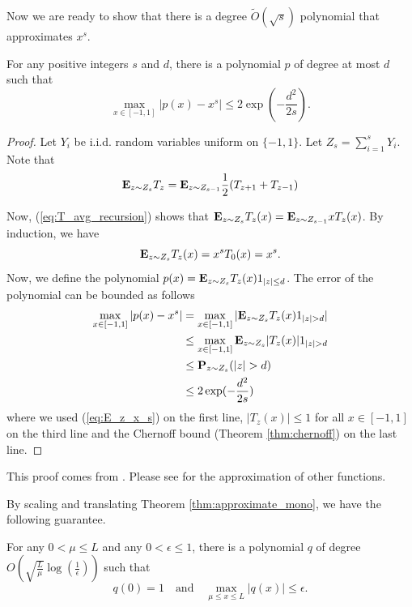 Now we are ready to show that there is a degree $\tilde{O}(\sqrt{s})$
polynomial that approximates $x^{s}$.
\begin{thm}
\label{thm:approximate_mono}For any positive integers $s$ and $d$,
there is a polynomial $p$ of degree at most $d$ such that
\[
\max_{x\in[-1,1]}|p(x)-x^{s}|\leq2\exp(-\frac{d^{2}}{2s}).
\]
\end{thm}

\begin{proof}
Let $Y_{i}$ be i.i.d. random variables uniform on $\{-1,1\}$. Let
$Z_{s}=\sum^{s}_{i=1}Y_{i}$. Note that
\[
\mathbf{E}_{z\sim Z_{s}}T_{z}=\mathbf{E}_{z\sim Z_{s-1}}\frac{1}{2}(T_{z+1}+T_{z-1})
\]

Now, (\ref{eq:T_avg_recursion}) shows that $\mathbf{E}_{z\sim Z_{s}}T_{z}(x)=\mathbf{E}_{z\sim Z_{s-1}}xT_{z}(x)$.
By induction, we have
\begin{equation}
\mathbf{E}_{z\sim Z_{s}}T_{z}(x)=x^{s}T_{0}(x)=x^{s}.\label{eq:E_z_x_s}
\end{equation}
Now, we define the polynomial $p(x)=\mathbf{E}_{z\sim Z_{s}}T_{z}(x)1_{|z|\leq d}$.
The error of the polynomial can be bounded as follows
\begin{align*}
\max_{x\in[-1,1]}|p(x)-x^{s}| & =\max_{x\in[-1,1]}|\E_{z\sim Z_{s}}T_{z}(x)1_{|z|>d}|\\
 & \leq\max_{x\in[-1,1]}\E_{z\sim Z_{s}}|T_{z}(x)|1_{|z|>d}\\
 & \leq\P_{z\sim Z_{s}}(|z|>d)\\
 & \leq2\exp(-\frac{d^{2}}{2s})
\end{align*}
where we used (\ref{eq:E_z_x_s}) on the first line, $|T_{z}(x)|\leq1$
for all $x\in[-1,1]$ on the third line and the Chernoff bound (Theorem
\ref{thm:chernoff}) on the last line.
\end{proof}
\begin{rem*}
This proof comes from \cite{sachdeva2014faster}. Please see \cite{sachdeva2014faster}
for the approximation of other functions.
\end{rem*}
By scaling and translating Theorem \ref{thm:approximate_mono}, we
have the following guarantee.
\begin{thm}
For any $0<\mu\leq L$ and any $0<\epsilon\leq1$, there is a polynomial
$q$ of degree $O(\sqrt{\frac{L}{\mu}}\log(\frac{1}{\epsilon}))$
such that 
\[
q(0)=1\quad\text{and}\quad\max_{\mu\leq x\leq L}\left|q(x)\right|\leq\epsilon.
\]
\end{thm}

